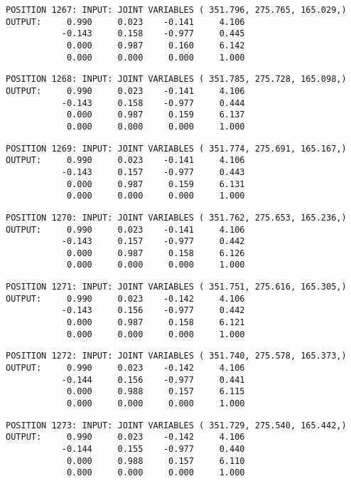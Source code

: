 \begin{verbatim}
POSITION 1267: INPUT: JOINT VARIABLES ( 351.796, 275.765, 165.029,)
OUTPUT:     0.990     0.023    -0.141     4.106
           -0.143     0.158    -0.977     0.445
            0.000     0.987     0.160     6.142
            0.000     0.000     0.000     1.000
\end{verbatim} \pagebreak[1]\begin{verbatim}
POSITION 1268: INPUT: JOINT VARIABLES ( 351.785, 275.728, 165.098,)
OUTPUT:     0.990     0.023    -0.141     4.106
           -0.143     0.158    -0.977     0.444
            0.000     0.987     0.159     6.137
            0.000     0.000     0.000     1.000
\end{verbatim} \pagebreak[1]\begin{verbatim}
POSITION 1269: INPUT: JOINT VARIABLES ( 351.774, 275.691, 165.167,)
OUTPUT:     0.990     0.023    -0.141     4.106
           -0.143     0.157    -0.977     0.443
            0.000     0.987     0.159     6.131
            0.000     0.000     0.000     1.000
\end{verbatim} \pagebreak[1]\begin{verbatim}
POSITION 1270: INPUT: JOINT VARIABLES ( 351.762, 275.653, 165.236,)
OUTPUT:     0.990     0.023    -0.141     4.106
           -0.143     0.157    -0.977     0.442
            0.000     0.987     0.158     6.126
            0.000     0.000     0.000     1.000
\end{verbatim} \pagebreak[1]\begin{verbatim}
POSITION 1271: INPUT: JOINT VARIABLES ( 351.751, 275.616, 165.305,)
OUTPUT:     0.990     0.023    -0.142     4.106
           -0.143     0.156    -0.977     0.442
            0.000     0.987     0.158     6.121
            0.000     0.000     0.000     1.000
\end{verbatim} \pagebreak[1]\begin{verbatim}
POSITION 1272: INPUT: JOINT VARIABLES ( 351.740, 275.578, 165.373,)
OUTPUT:     0.990     0.023    -0.142     4.106
           -0.144     0.156    -0.977     0.441
            0.000     0.988     0.157     6.115
            0.000     0.000     0.000     1.000
\end{verbatim} \pagebreak[1]\begin{verbatim}
POSITION 1273: INPUT: JOINT VARIABLES ( 351.729, 275.540, 165.442,)
OUTPUT:     0.990     0.023    -0.142     4.106
           -0.144     0.155    -0.977     0.440
            0.000     0.988     0.157     6.110
            0.000     0.000     0.000     1.000
\end{verbatim} \pagebreak[1]\begin{verbatim}

\end{verbatim}
